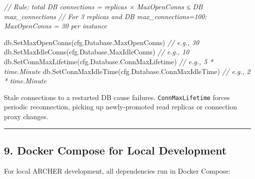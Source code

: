 \documentclass[
]{article}
\newenvironment{Shaded}{}{}
\newcommand{\CommentTok}[1]{\textcolor[rgb]{0.38,0.63,0.69}{\textit{#1}}}
\newcommand{\NormalTok}[1]{#1}
\newcommand{\OperatorTok}[1]{\textcolor[rgb]{0.40,0.40,0.40}{#1}}
\begin{document}
\begin{Shaded}
\begin{Highlighting}[]
\CommentTok{// Rule: total DB connections = replicas × MaxOpenConns ≤ DB max\_connections}
\CommentTok{// For 3 replicas and DB max\_connections=100: MaxOpenConns = 30 per instance}

\NormalTok{db}\OperatorTok{.}\NormalTok{SetMaxOpenConns}\OperatorTok{(}\NormalTok{cfg}\OperatorTok{.}\NormalTok{Database}\OperatorTok{.}\NormalTok{MaxOpenConns}\OperatorTok{)}         \CommentTok{// e.g., 30}
\NormalTok{db}\OperatorTok{.}\NormalTok{SetMaxIdleConns}\OperatorTok{(}\NormalTok{cfg}\OperatorTok{.}\NormalTok{Database}\OperatorTok{.}\NormalTok{MaxIdleConns}\OperatorTok{)}         \CommentTok{// e.g., 10}
\NormalTok{db}\OperatorTok{.}\NormalTok{SetConnMaxLifetime}\OperatorTok{(}\NormalTok{cfg}\OperatorTok{.}\NormalTok{Database}\OperatorTok{.}\NormalTok{ConnMaxLifetime}\OperatorTok{)}   \CommentTok{// e.g., 5 * time.Minute}
\NormalTok{db}\OperatorTok{.}\NormalTok{SetConnMaxIdleTime}\OperatorTok{(}\NormalTok{cfg}\OperatorTok{.}\NormalTok{Database}\OperatorTok{.}\NormalTok{ConnMaxIdleTime}\OperatorTok{)}   \CommentTok{// e.g., 2 * time.Minute}
\end{Highlighting}
\end{Shaded}

Stale connections to a restarted DB cause failures.
\texttt{ConnMaxLifetime} forces periodic reconnection, picking up
newly-promoted read replicas or connection proxy changes.

\begin{center}\rule{0.5\linewidth}{0.5pt}\end{center}

\hypertarget{docker-compose-for-local-development}{%
\subsection{9. Docker Compose for Local
Development}\label{docker-compose-for-local-development}}

For local ARCHER development, all dependencies run in Docker Compose:
\end{document}
